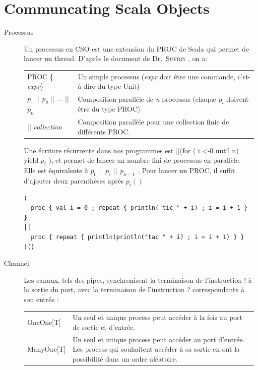 \documentclass[a4paper,11pt,french]{report}
\begin{document}
\section{Communcating Scala Objects}
\begin{description}
\item[Processus] Un processus en CSO est une extension du PROC de Scala qui permet de lancer un thread. D'après le document de Dr.\ \textsc{Sufrin} \cite{cpa2008-cso}, on a:
\begin{center}
\begin{tabular}{lp{}}
\textsc{PROC} \{ \emph{expr}\} & Un simple processus (\emph{expr} doit être une commande, c'st-à-dire du type \textsf{Unit})\\ 
\emph{$p_{1}$} || \emph{$p_{2}$} || ... || \emph{$p_{n}$}  & Composition parallèle de \emph{n} processus (chaque \emph{$p_{i}$} doivent être du type \textsc{PROC})\\
|| \emph{collection} & Composition parallèle pour une collection finie de différents \textsc{PROC}. \\ 
\end{tabular} 
\end{center}
Une écriture récurrente dans nos programmes est \textsf{||(for ( i <-0 until n) yield $p_{i}$ )}, et permet de lancer un nombre fini de processus en parallèle. Elle est équivalente à \textsf{ $p_{0}$ ||  $p_{1}$ ||  $p_{n-1}$ }.
Pour lancer un \textsc{PROC}, il suffit d'ajouter deux parenthèses après \textsf{$p_i()$}

\begin{lstlisting}[frame=trBL]
( 
  proc { val i = 0 ; repeat { println("tic " + i) ; i = i + 1 } }
|| 
  proc { repeat { println(println("tac " + i) ; i = i + 1) } }
)()
\end{lstlisting}

\item[Channel] Les \textsf{canaux}, tels des pipes, synchronisent la terminaison de l'instruction \textsf{!} à la sortie du port, avec la terminaison de l'instruction \textsf{?} correspondante à son entrée :

\begin{center}
\begin{tabular}{lp{}}
\textsf{OneOne[T]} & Un seul et unique process peut accéder à la fois au port de sortie et d'entrée.\\

\textsf{ManyOne[T]} & Un seul et unique process peut accéder au port d'entrée. Les process qui souhaitent accéder à sa sortie en ont la possibilité dans un ordre aléatoire.\\


\end{tabular}
\end{center}
\end{description}
\end{document}
